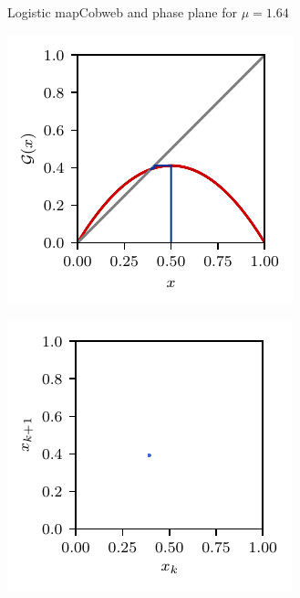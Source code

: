 \documentclass[usenames,dvipsnames,svgnames,10pt,aspectratio=169]{beamer}
\begin{document}
\begin{frame}[t, c]{Logistic map}{Cobweb and phase plane for $\mu = 1.64$}
	\begin{minipage}{.48\textwidth}
		\centering
		\includegraphics[width=.75\textwidth]{logistic_map_cobweb_plot_2}
	\end{minipage}%
	\begin{minipage}{.48\textwidth}
		\centering
		\includegraphics[width=.75\textwidth]{logistic_map_phase_plane_2}
	\end{minipage}

	\vspace{1cm}
\end{frame}
\end{document}
